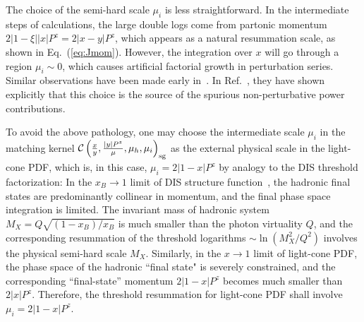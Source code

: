 \documentclass[a4paper,11pt]{article}
\begin{document}
The choice of the semi-hard scale $\mu_i$ is less straightforward. In the intermediate steps of calculations, the large double logs come from partonic momentum $2|1-\xi||x| P^z = 2|x-y| P^z$, which appears as a natural resummation scale, as shown in Eq.~(\ref{eq:Jmom}). However, the integration over $x$ will go through a region $\mu_i \sim 0$, which causes artificial factorial growth in perturbation series. Similar observations have been made early in~\cite{Catani:1996yz,Becher:2006mr}. In Ref.~\cite{Becher:2006mr}, they have shown explicitly that this choice is the source of the spurious non-perturbative power contributions.

To avoid the above pathology, one may choose the intermediate scale $\mu_i$ in the matching kernel ${\cal C}\left(\frac{x}{y},\frac{|y| P^z}{\mu},\mu_h,\mu_i\right)_{\rm sg}$ as the external physical scale in the light-cone PDF, which is, in this case, $\mu_i = 2|1-x|P^z$ by analogy to the DIS threshold factorization: 
In the $x_B \rightarrow 1$ limit of DIS structure function~\cite{Becher:2006mr}, the hadronic final states are predominantly collinear in momentum, and the final phase space integration is limited. The invariant mass of hadronic system $M_{X} = Q \sqrt{(1-x_B)/x_B}$ is much smaller than the photon virtuality $Q$,  and the corresponding resummation of the threshold logarithms $\sim \ln\left(M_{X}^2/Q^2\right)$ involves the physical semi-hard scale $M_{X}$. Similarly, in the $x \rightarrow 1$ limit of light-cone PDF, the phase space of the hadronic ``final state" is severely constrained, and the corresponding ``final-state'' momentum $2|1-x|P^z$ becomes much smaller than $2|x|P^z$. Therefore, the threshold resummation for light-cone PDF shall involve $\mu_i = 2|1-x|P^z$. 
\end{document}
